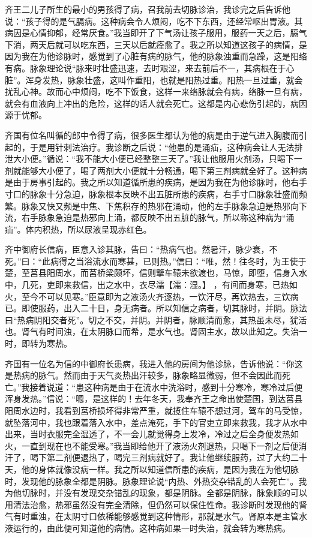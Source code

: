 \documentclass[12pt,UTF8]{ctexbook}
\begin{document}
齐王二儿子所生的最小的男孩得了病，召我前去切脉诊治，我诊完之后告诉他说：“孩子得的是气膈病。这种病会令人烦闷，吃不下东西，还经常呕出胃液。其病因是心情抑郁，经常厌食。”我当即开了下气汤让孩子服用，服药一天之后，膈气下消，两天后就可以吃东西，三天以后就痊愈了。我之所以知道这孩子的病情，是因为我在为他诊脉时，感觉到了心脏有病的脉气，他的脉象浊重而急躁，这是阳络有病。脉象理论说“脉来时壮盛迅速，去时艰涩，来去前后不一，其病根在于心脏”。浑身发热，脉象壮盛，这叫作重阳，也就是阳热过重。阳热一旦过重，就会扰乱心神。故而心中烦闷，吃不下饭食，这样一来络脉就会有病，络脉一旦有病，就会有血液向上冲出的危险，这样的话人就会死亡。这都是内心悲伤引起的，病因源于忧郁。

齐国有位名叫循的郎中令得了病，很多医生都认为他的病是由于逆气进入胸腹而引起的，于是用针刺法治疗。我诊断之后说：“他患的是涌疝，这种病会让人无法排泄大小便。”循说：“我不能大小便已经整整三天了。”我让他服用火剂汤，只喝下一剂就能够大小便了，喝了两剂大小便就十分畅通，喝下第三剂病就全好了。这种病是由于房事引起的。我之所以知道循所患的疾病，是因为我在为他诊脉时，他右手寸口的脉象十分急迫，脉象根本反映不出五脏所患的疾病，右手寸口脉象壮盛而频繁。脉象又快又频是中焦、下焦积存的热邪在涌动，他的左手脉象急迫是热邪向下流，右手脉象急迫是热邪向上涌，都反映不出五脏的脉气，所以称这种病为“涌疝”。体内积热，所以尿液呈现赤红色。

齐中御府长信病，臣意入诊其脉，告曰：“热病气也。然暑汗，脉少衰，不死。”曰：“此病得之当浴流水而寒甚，已则热。”信曰：“唯，然！往冬时，为王使于楚，至莒县阳周水，而莒桥梁颇坏，信则擥车辕未欲渡也，马惊，即堕，信身入水中，几死，吏即来救信，出之水中，衣尽濡【濡：湿。】 ，有间而身寒，已热如火，至今不可以见寒。”臣意即为之液汤火齐逐热，一饮汗尽，再饮热去，三饮病已。即使服药，出入二十日，身无病者。所以知信之病者，切其脉时，并阴。脉法曰“热病阴阳交者死”。切之不交，并阴。并阴者，脉顺清而愈，其热虽未尽，犹活也。肾气有时间浊，在太阴脉口而希，是水气也。肾固主水，故以此知之。失治一时，即转为寒热。

齐国有一位名为信的中御府长患病，我进入他的房间为他诊脉，告诉他说：“你这是热病的脉气。然而由于天气炎热出汗较多，脉象略显微弱，但不会因此而死亡。”我接着说道：“患这种病是由于在流水中洗浴时，感到十分寒冷，寒冷过后便浑身发热。”信说：“嗯，是这样的！去年冬天，我奉齐王之命出使楚国，到达莒县阳周水边时，我看到莒桥损坏得非常严重，就揽住车辕不想过河，驾车的马受惊，就坠落河中，我也跟着落入水中，差点淹死，手下的官吏立即来救我，我才从水中出来，当时衣服完全湿透了，不一会儿就觉得身上发冷，冷过之后全身便发热如火，一直到现在也不能受寒。”我当即给他开了液汤火剂退热，只喝下一剂之后便消汗了，喝下第二剂便退热了，喝完三剂病就好了。我让他继续服药，过了大约二十天，他的身体就像没病一样。我之所以知道信所患的疾病，是因为我在为他切脉时，发现他的脉象全都是阴脉。脉象理论说“内热、外热交杂错乱的人会死亡”。我为他切脉时，并没有发现交杂错乱的现象，都是阴脉。全都是阴脉，脉象顺的可以用清法治愈，热邪虽然没有完全清除，但仍然可以保住性命。我诊断时发现他的肾气有时重浊，在太阴寸口依稀能够感觉到这种情形，那就是水气。肾原本是主管水液运行的，由此便可知道他的病情。这种病如果一时失治，就会转为寒热病。
\end{document}
